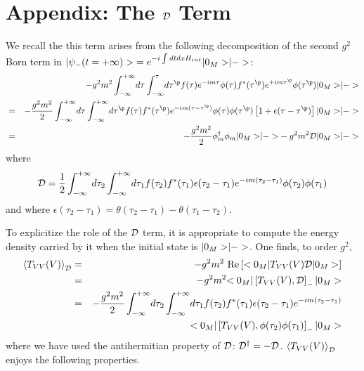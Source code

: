 \section{Appendix: The $\cal{D}$ Term}\label{app}


We recall the this term arises from the following
decomposition of the second $g^2$ Born term in
$\mbox{$ \vert \psi_-(t=+\infty) > $}=e^{-i \int dt dx H_{int}}\mbox{$ \vert 0_M > $} \mbox{$ \vert - > $}$:
\begin{eqnarray}
& & - g^2 m^2
\int_{-\infty}^{+\infty}\!
d\tau
\int_{-\infty}^{\tau}\!
d\tau^\p f(\tau) e^{-im\tau}  \phi(\tau)
  f^*(\tau^\p) e^{+im\tau^\p}  \phi(\tau^\p)\ket{0_M}
\ket{-}\nonumber \\
&=& - {g^2 m^2 \over 2}
\int_{-\infty}^{+\infty}\!
d\tau
\int_{-\infty}^{+\infty}\!
d\tau^\p f(\tau)f^*(\tau^\p)
e^{-im(\tau-\tau^\p)} \phi(\tau) \phi(\tau^\p)
\left[ 1 + \epsilon(\tau - \tau^\p)\right]
\ket{0_M}
\ket{-}\nonumber \\
&=& -{g^2 m^2\over 2}
\phi_m^\dagger \phi_m \ket{0_M}\ket{-}
-  g^2 m^2
{\cal D}  \ket{0_M}\ket{-}
\label{stateA}
\end{eqnarray}
where
\begin{equation}
{\cal D} = {1 \over 2}
\int_{-\infty}^{+\infty}\!  d\tau_2
\int_{-\infty}^{+\infty}\!
  d \tau_1 f(\tau_2) f^*(\tau_1)
\epsilon(\tau_2 - \tau_1) e^{-i m( \tau_2- \tau_1)}
\phi(\tau_2) \phi(\tau_1)
\label{calDA}
\end{equation}
and where $\epsilon(\tau_2 - \tau_1) = \theta(\tau_2 - \tau_1) -
\theta(\tau_1 - \tau_2 )$.

To explicitize the role of the ${\cal D}$ term, it is appropriate
to compute the energy density carried by it when the initial state is
$\mbox{$ \vert 0_M > $}\mbox{$ \vert - > $}$.
One finds, to  order $g^2$,
\begin{eqnarray}
\mbox{$ \langle T_{VV}(V) \rangle $}_{{\cal D}}&=&  -g^2 m^2
\mbox{ Re}\left[ \mbox{$ < 0_M \vert $} T_{VV}(V) {\cal D} \mbox{$ \vert 0_M > $}\right]
\nonumber \\
&=&  -g^2 m^2
 \mbox{$ < 0_M \vert $} \left[ T_{VV}(V),{\cal D}\right]_- \mbox{$ \vert 0_M > $}
\nonumber \\
&=& - {g^2 m^2 \over 2}
\int_{-\infty}^{+\infty} \! d\tau_2
\int_{-\infty}^{+\infty} \! d \tau_1
f(\tau_2)  f^*(\tau_1)
\epsilon(\tau_2 - \tau_1)
 e^{-i m( \tau_2- \tau_1)}
\nonumber \\
& &\quad \quad \quad \quad \quad \quad \quad \quad \quad \quad
\mbox{$ < 0_M \vert $} \left[T_{VV}(V), \phi(\tau_2)\phi(\tau_1) \right]_- \mbox{$ \vert 0_M > $}
\label{Comm}
\end{eqnarray}
where we have used the antihermitian property of ${\cal D}$:
${\cal D}^\dagger =
-{\cal D}$.
$\mbox{$ \langle T_{VV}(V) \rangle $}_{{\cal D}}$ enjoys the following properties.

